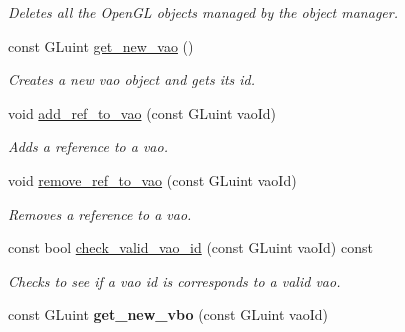 \begin{DoxyCompactItemize}
\begin{DoxyCompactList}\small\item\em Deletes all the Open\+G\+L objects managed by the object manager. \end{DoxyCompactList}\item 
const G\+Luint \hyperlink{classoccluded_1_1opengl_1_1retained_1_1gl__retained__object__manager_af3d501abe926a5943cceb3cd9efaf7e6}{get\+\_\+new\+\_\+vao} ()
\begin{DoxyCompactList}\small\item\em Creates a new vao object and gets its id. \end{DoxyCompactList}\item 
void \hyperlink{classoccluded_1_1opengl_1_1retained_1_1gl__retained__object__manager_a9662a7b3b53c17b50f43da4918128b74}{add\+\_\+ref\+\_\+to\+\_\+vao} (const G\+Luint vao\+Id)
\begin{DoxyCompactList}\small\item\em Adds a reference to a vao. \end{DoxyCompactList}\item 
void \hyperlink{classoccluded_1_1opengl_1_1retained_1_1gl__retained__object__manager_a651ed9bf5852f8919947b84a7a13c891}{remove\+\_\+ref\+\_\+to\+\_\+vao} (const G\+Luint vao\+Id)
\begin{DoxyCompactList}\small\item\em Removes a reference to a vao. \end{DoxyCompactList}\item 
const bool \hyperlink{classoccluded_1_1opengl_1_1retained_1_1gl__retained__object__manager_af6c25070b348972d07992e5c7a50df3d}{check\+\_\+valid\+\_\+vao\+\_\+id} (const G\+Luint vao\+Id) const 
\begin{DoxyCompactList}\small\item\em Checks to see if a vao id is corresponds to a valid vao. \end{DoxyCompactList}\item 
\hypertarget{classoccluded_1_1opengl_1_1retained_1_1gl__retained__object__manager_afc09147dab98bfb3a4ebe825e7eb2b43}{const G\+Luint {\bfseries get\+\_\+new\+\_\+vbo} (const G\+Luint vao\+Id)}\label{classoccluded_1_1opengl_1_1retained_1_1gl__retained__object__manager_afc09147dab98bfb3a4ebe825e7eb2b43}


\end{DoxyCompactItemize}
